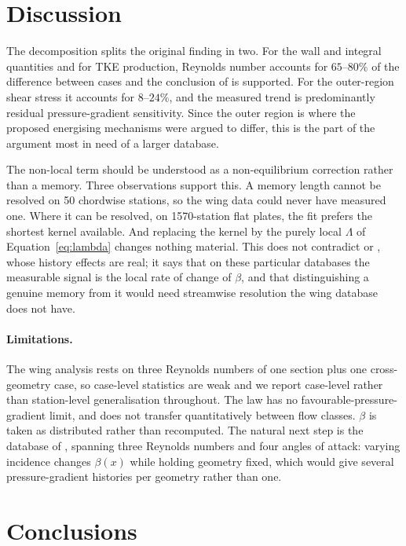 \documentclass[11pt,a4paper]{article}
\begin{document}
\section{Discussion}

The decomposition splits the original finding in two. For the wall and
integral quantities and for TKE production, Reynolds number accounts for
$65$--$80\%$ of the difference between cases and the conclusion of
\citet{vinuesa2018} is supported. For the outer-region shear stress it
accounts for $8$--$24\%$, and the measured trend is predominantly residual
pressure-gradient sensitivity. Since the outer region is where the proposed
energising mechanisms were argued to differ, this is the part of the
argument most in need of a larger database.

The non-local term should be understood as a non-equilibrium correction
rather than a memory. Three observations support this. A memory length
cannot be resolved on 50 chordwise stations, so the wing data could never
have measured one. Where it can be resolved, on 1570-station flat plates,
the fit prefers the shortest kernel available. And replacing the kernel by
the purely local $\Lambda$ of Equation~\eqref{eq:lambda} changes nothing
material. This does not contradict \citet{clauser1956} or
\citet{bobke2017}, whose history effects are real; it says that on these
particular databases the measurable signal is the local rate of change of
$\beta$, and that distinguishing a genuine memory from it would need
streamwise resolution the wing database does not have.

\paragraph{Limitations.} The wing analysis rests on three Reynolds numbers
of one section plus one cross-geometry case, so case-level statistics are
weak and we report case-level rather than station-level generalisation
throughout. The law has no favourable-pressure-gradient limit, and does not
transfer quantitatively between flow classes. $\beta$ is taken as
distributed rather than recomputed. The natural next step is the database of
\citet{mallor2024}, spanning three Reynolds numbers and four angles of
attack: varying incidence changes $\beta(x)$ while holding geometry fixed,
which would give several pressure-gradient histories per geometry rather
than one.

\section{Conclusions}
\end{document}
